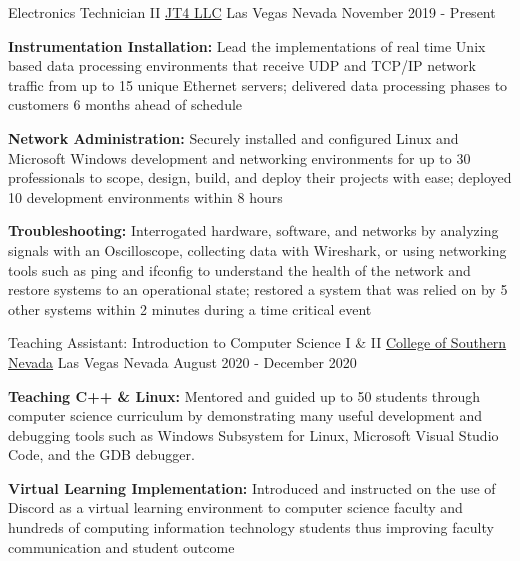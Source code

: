 
\begin{cventries}

  \cventry
    {Electronics Technician II} %
    {\href{https://www.jt4llc.com/}{JT4 LLC}} %
    {Las Vegas Nevada} %
    {November 2019 - Present} %
    {
      \begin{cvitems} %
        \item {\textbf{Instrumentation Installation:} Lead the implementations of real time Unix based data processing environments that receive UDP and TCP/IP network traffic from up to 15 unique Ethernet servers; delivered data processing phases to customers 6 months ahead of schedule}
        \item {\textbf{Network Administration:} Securely installed and configured Linux and Microsoft Windows development and networking environments for up to 30 professionals to scope, design, build, and deploy their projects with ease; deployed 10 development environments within 8 hours}
        \item {\textbf{Troubleshooting:} Interrogated hardware, software, and networks by analyzing signals with an Oscilloscope, collecting data with Wireshark, or using networking tools such as ping and ifconfig to understand the health of the network and restore systems to an operational state; restored a system that was relied on by 5 other systems within 2 minutes during a time critical event}
      \end{cvitems}
    }
  \cventry
    {Teaching Assistant: Introduction to Computer Science I \& II} %
    {\href{https://www.csn.edu/}{College of Southern Nevada}} %
    {Las Vegas Nevada} %
    {August 2020 - December 2020} %
    {
      \begin{cvitems} %
        \item {\textbf{Teaching C++ \& Linux:} Mentored and guided up to 50 students through computer science curriculum by demonstrating many useful development and debugging tools such as Windows Subsystem for Linux, Microsoft Visual Studio Code, and the GDB debugger.}
        \item {\textbf{Virtual Learning Implementation:} Introduced and instructed on the use of Discord as a virtual learning environment to computer science faculty and hundreds of computing information technology students thus improving faculty communication and student outcome}
      \end{cvitems}
    }


\end{cventries}

